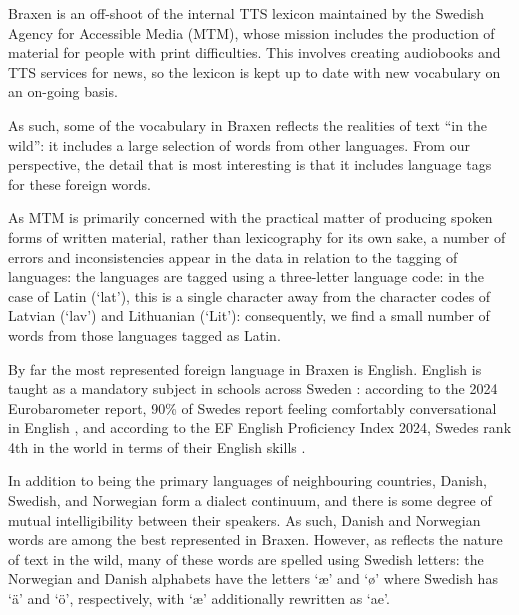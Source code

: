 \documentclass[10pt, a4paper]{article}
\begin{document}
Braxen is an off-shoot of the internal TTS lexicon maintained by the Swedish Agency for Accessible Media (MTM), whose mission includes the production of material for people with print difficulties. This involves creating audiobooks and TTS services for news, so the lexicon is kept up to date with new vocabulary on an on-going basis.

As such, some of the vocabulary in Braxen reflects the realities of text ``in the wild'': it includes a large selection of words from other languages. From our perspective, the detail that is most interesting is that it includes language tags for these foreign words.

As MTM is primarily concerned with the practical matter of producing spoken forms of written material, rather than lexicography for its own sake, a number of errors and inconsistencies appear in the data in relation to the tagging of languages: the languages are tagged using a three-letter language code: in the case of Latin (`lat'), this is a single character away from the character codes of Latvian (`lav') and Lithuanian (`Lit'): consequently, we find a small number of words from those languages tagged as Latin.

By far the most represented foreign language in Braxen is English.
English is taught as a mandatory subject in schools across Sweden \cite{norrby2014english}: according to the 2024 Eurobarometer report, 90\% of Swedes report feeling comfortably conversational in English \cite{eurobarometer2024languages}, and according to the EF English Proficiency Index 2024, Swedes rank 4th in the world in terms of their English skills \cite{efepi2024}.

In addition to being the primary languages of neighbouring countries, Danish, Swedish, and Norwegian form a dialect continuum, and there is some degree of mutual intelligibility between their speakers. As such, Danish and Norwegian words are among the best represented in Braxen. However, as reflects the nature of text in the wild, many of these words are spelled using Swedish letters: the Norwegian and Danish alphabets have the letters `æ' and `ø' where Swedish has `ä' and `ö', respectively, with `æ' additionally rewritten as `ae'.

\end{document}
